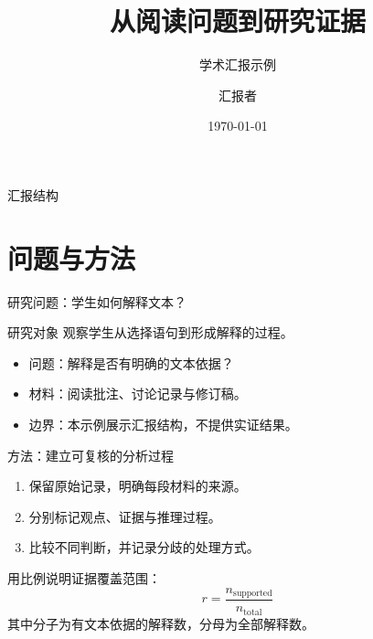\documentclass[aspectratio=169]{ctexbeamer}
\title{从阅读问题到研究证据}
\subtitle{学术汇报示例}
\author{汇报者}
\institute{湖南文理学院}
\date{\today}
\begin{document}
\HUASmaketitle
\begin{frame}{汇报结构}
  \tableofcontents[hideallsubsections]
\end{frame}
\section{问题与方法}
\begin{frame}{研究问题：学生如何解释文本？}
  \begin{block}{研究对象}
    观察学生从选择语句到形成解释的过程。
  \end{block}
  \begin{itemize}
    \item 问题：解释是否有明确的文本依据？
    \item 材料：阅读批注、讨论记录与修订稿。
    \item 边界：本示例展示汇报结构，不提供实证结果。
  \end{itemize}
\end{frame}
\begin{frame}{方法：建立可复核的分析过程}
  \begin{enumerate}
    \item 保留原始记录，明确每段材料的来源。
    \item 分别标记观点、证据与推理过程。
    \item 比较不同判断，并记录分歧的处理方式。
  \end{enumerate}
  \medskip
  用比例说明证据覆盖范围：
  \[
    r=\frac{n_{\mathrm{supported}}}{n_{\mathrm{total}}}
  \]
  其中分子为有文本依据的解释数，分母为全部解释数。
\end{frame}
\end{document}

